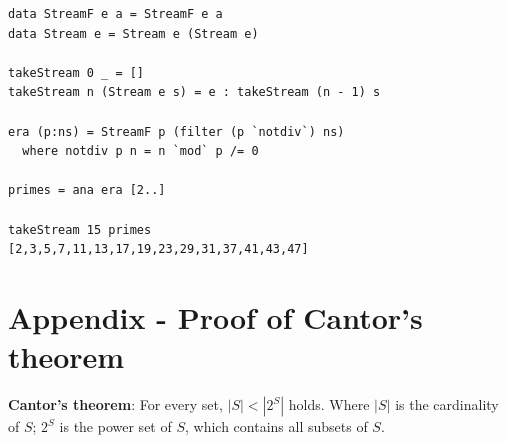 \documentclass{article}
\begin{document}
\lstset{frame=single, language=Haskell}
\begin{lstlisting}
data StreamF e a = StreamF e a
data Stream e = Stream e (Stream e)

takeStream 0 _ = []
takeStream n (Stream e s) = e : takeStream (n - 1) s

era (p:ns) = StreamF p (filter (p `notdiv`) ns)
  where notdiv p n = n `mod` p /= 0

primes = ana era [2..]

takeStream 15 primes
[2,3,5,7,11,13,17,19,23,29,31,37,41,43,47]
\end{lstlisting}

\section{Appendix - Proof of Cantor's theorem}

\begin{theorem}
\textbf{Cantor's theorem}: For every set, $|S| < |2^S|$ holds. Where $|S|$ is the cardinality of $S$; $2^S$ is the power set of $S$, which contains all subsets of $S$.
\end{theorem}
\end{document}
